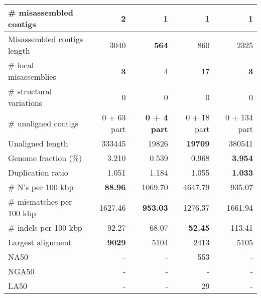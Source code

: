 \documentclass[12pt,a4paper]{article}
\begin{document}
\begin{table}[ht]
\begin{center}
\begin{tabular}{|l*{4}{|r}|}
\# misassembled contigs & 2 & {\bf 1} & {\bf 1} & {\bf 1} \\ \hline
Misassembled contigs length & 3040 & {\bf 564} & 860 & 2325 \\ \hline
\# local misassemblies & {\bf 3} & 4 & 17 & {\bf 3} \\ \hline
\# structural variations & 0 & 0 & 0 & 0 \\ \hline
\# unaligned contigs & 0 + 63 part & {\bf 0 + 4 part} & 0 + 18 part & 0 + 134 part \\ \hline
Unaligned length & 333445 & 19826 & {\bf 19709} & 380541 \\ \hline
Genome fraction (\%) & 3.210 & 0.539 & 0.968 & {\bf 3.954} \\ \hline
Duplication ratio & 1.051 & 1.184 & 1.055 & {\bf 1.033} \\ \hline
\# N's per 100 kbp & {\bf 88.96} & 1069.70 & 4647.79 & 935.07 \\ \hline
\# mismatches per 100 kbp & 1627.46 & {\bf 953.03} & 1276.37 & 1661.94 \\ \hline
\# indels per 100 kbp & 92.27 & 68.07 & {\bf 52.45} & 113.41 \\ \hline
Largest alignment & {\bf 9029} & 5104 & 2413 & 5105 \\ \hline
NA50 & - & - & 553 & - \\ \hline
NGA50 & - & - & - & - \\ \hline
LA50 & - & - & 29 & - \\ \hline
\end{tabular}
\end{center}
\end{table}
\end{document}
